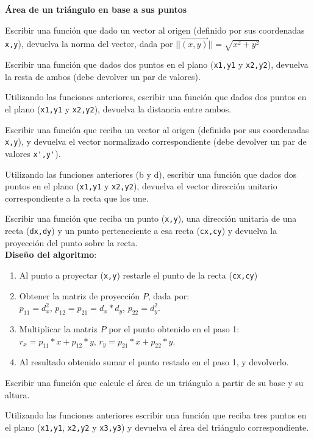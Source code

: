 \begin{ejercicio}
{\bf Área de un triángulo en base a sus puntos}
\begin{partes}

    \item Escribir una función que dado un vector al origen (definido por sus
 coordenadas \verb!x,y!), devuelva la norma del vector, dada por
 $||\vec{(x,y)}||=\sqrt{x^2+y^2}$

    \item Escribir una función que dados dos puntos en el plano (\verb!x1,y1! y
 \verb!x2,y2!), devuelva la resta de ambos (debe devolver un par de
 valores).

    \item Utilizando las funciones anteriores, escribir una función que dados dos
 puntos en el plano (\verb!x1,y1! y \verb!x2,y2!), devuelva la distancia
 entre ambos.

    \item Escribir una función que reciba un vector al origen (definido por sus
 coordenadas \verb!x,y!), y devuelva el vector normalizado correspondiente (debe
 devolver un par de valores \verb!x',y'!).

    \item Utilizando las funciones anteriores (b y d), escribir una función que
 dados dos puntos en el plano (\verb!x1,y1! y \verb!x2,y2!), devuelva el
 vector dirección unitario correspondiente a la recta que los une.

    \item Escribir una función que reciba un punto (\verb!x,y!), una dirección
 unitaria de una recta (\verb!dx,dy!) y un punto perteneciente a esa recta
 (\verb!cx,cy!) y devuelva la proyección del punto sobre la recta. \\
 {\bf Diseño del algoritmo}:
 \begin{enumerate}
     \setlength{\itemsep}{0pt}
     \setlength{\parsep}{0pt}
     \item Al punto a proyectar (\verb!x,y!) restarle el punto de la recta
 (\verb!cx,cy!)
     \item Obtener la matriz de proyección $P$, dada por:  \\
 $p_{11} = d_x^2$,  $p_{12} = p_{21} = d_x*d_y$, $p_{22} = d_y^2$.
     \item Multiplicar la matriz $P$ por el punto obtenido en el paso 1: \\
 $r_x = p_{11} * x + p_12 * y$, $r_y = p_{21} * x + p_{22} * y$.
     \item Al resultado obtenido sumar el punto restado en el paso 1, y
 devolverlo.
 \end{enumerate}

    \item Escribir una función que calcule el área de un triángulo a partir de
 su base y su altura.

    \item Utilizando las funciones anteriores escribir una función que reciba
 tres puntos en el plano (\verb!x1,y1!, \verb!x2,y2! y \verb!x3,y3!) y
 devuelva el área del triángulo correspondiente.
\end{partes}
\end{ejercicio}
